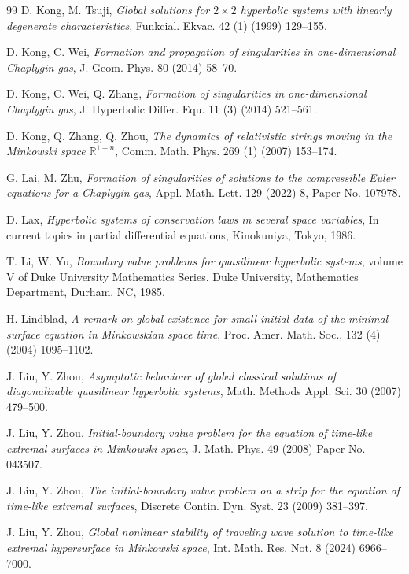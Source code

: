 \documentclass[10pt,leqno]{amsart}
\numberwithin{equation}{section}
\begin{document}
\begin{thebibliography}{99}
D. Kong, M. Tsuji,
\textit{Global solutions for $2 \times 2$ hyperbolic systems with linearly
	degenerate characteristics}, Funkcial. Ekvac. 42 (1) (1999) 129–155.


D. Kong, C. Wei,
\textit{Formation and propagation of singularities in one-dimensional Chaplygin gas}, J. Geom. Phys. 80 (2014) 58–70.


D. Kong, C. Wei, Q. Zhang,
\textit{Formation of singularities in one-dimensional Chaplygin gas}, J. Hyperbolic Differ. Equ. 11 (3) (2014) 521–561.


D. Kong, Q. Zhang, Q. Zhou,
\textit{The dynamics of relativistic strings moving in the Minkowski space $\mathbb{R}^{1+n}$}, Comm. Math. Phys. 269 (1) (2007) 153–174.


G. Lai, M. Zhu,
\textit{Formation of singularities of solutions to the compressible Euler
	equations for a Chaplygin gas}, Appl. Math. Lett. 129 (2022) 8, Paper No. 107978.


D. Lax,
\textit{Hyperbolic systems of conservation laws in several space variables}, In
current topics in partial differential equations, Kinokuniya, Tokyo, 1986.


T. Li, W. Yu,
\textit{Boundary value problems for quasilinear hyperbolic systems}, volume V of Duke University Mathematics Series. Duke University, Mathematics
Department, Durham, NC, 1985.

H. Lindblad,
\textit{A remark on global existence for small initial data of the minimal surface
	equation in Minkowskian space time}, Proc. Amer. Math. Soc., 132 (4) (2004) 1095–1102.

J. Liu, Y. Zhou,
\textit{Asymptotic behaviour of global classical solutions of diagonalizable quasilinear
	hyperbolic systems}, Math. Methods Appl. Sci. 30 (2007) 479–500.
	
J. Liu, Y. Zhou,
\textit{Initial-boundary value problem for the equation of time-like extremal surfaces
	in Minkowski space}, J. Math. Phys. 49 (2008) Paper No. 043507.
	
		
J. Liu, Y. Zhou,
\textit{The initial-boundary value problem on a strip for the equation of time-like extremal surfaces}, Discrete Contin. Dyn. Syst. 23 (2009) 381–397.


J. Liu, Y. Zhou,
\textit{Global nonlinear stability of traveling wave solution to time-like
	extremal hypersurface in Minkowski space}, Int. Math. Res. Not. 8 (2024) 6966–7000.
  

\end{thebibliography}
\end{document}
